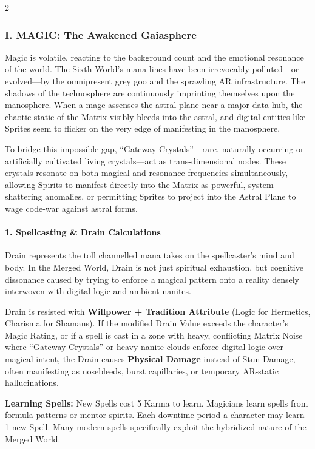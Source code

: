 \documentclass[
  oneside]{article}
\begin{document}
\begin{multicols}{2}

\hypertarget{i.-magic-the-awakened-gaiasphere}{%
\subsubsection{I. MAGIC: The Awakened
Gaiasphere}\label{i.-magic-the-awakened-gaiasphere}}

Magic is volatile, reacting to the background
count and the emotional resonance of the world.
The Sixth World's mana lines have been irrevocably
polluted---or evolved---by the omnipresent grey
goo and the sprawling AR infrastructure. The
shadows of the technosphere are continuously
imprinting themselves upon the manosphere. When a
mage assenses the astral plane near a major data
hub, the chaotic static of the Matrix visibly
bleeds into the astral, and digital entities like
Sprites seem to flicker on the very edge of
manifesting in the manosphere.

To bridge this impossible gap, ``Gateway
Crystals''---rare, naturally occurring or
artificially cultivated living crystals---act as
trans-dimensional nodes. These crystals resonate
on both magical and resonance frequencies
simultaneously, allowing Spirits to manifest
directly into the Matrix as powerful,
system-shattering anomalies, or permitting Sprites
to project into the Astral Plane to wage code-war
against astral forms.

\hypertarget{spellcasting-drain-calculations}{%
\paragraph{1. Spellcasting \& Drain
Calculations}\label{spellcasting-drain-calculations}}

Drain represents the toll channelled mana takes on
the spellcaster's mind and body. In the Merged
World, Drain is not just spiritual exhaustion, but
cognitive dissonance caused by trying to enforce a
magical pattern onto a reality densely interwoven
with digital logic and ambient nanites.

Drain is resisted with \textbf{Willpower +
Tradition Attribute} (Logic for Hermetics,
Charisma for Shamans). If the modified Drain Value
exceeds the character's Magic Rating, or if a
spell is cast in a zone with heavy, conflicting
Matrix Noise where ``Gateway Crystals'' or heavy
nanite clouds enforce digital logic over magical
intent, the Drain causes \textbf{Physical Damage}
instead of Stun Damage, often manifesting as
nosebleeds, burst capillaries, or temporary
AR-static hallucinations.

\textbf{Learning Spells:} New Spells cost 5 Karma
to learn. Magicians learn spells from formula
patterns or mentor spirits. Each downtime period a
character may learn 1 new Spell. Many modern
spells specifically exploit the hybridized nature
of the Merged World.

\end{multicols}
\end{document}
